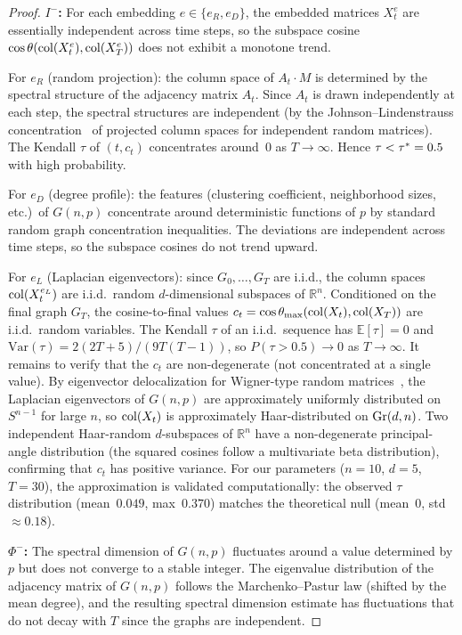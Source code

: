 \documentclass{../shared/primo}
\begin{document}
\begin{proof}
\textbf{$I^-$:} For each embedding $e \in \{e_R, e_D\}$, the embedded matrices $X_t^e$ are essentially independent across time steps, so the subspace cosine $\cos\theta(\operatorname{col}(X_t^e), \operatorname{col}(X_T^e))$ does not exhibit a monotone trend.

For $e_R$ (random projection): the column space of $A_t \cdot M$ is determined by the spectral structure of the adjacency matrix $A_t$. Since $A_t$ is drawn independently at each step, the spectral structures are independent (by the Johnson--Lindenstrauss concentration~\cite{johnson1984extensions} of projected column spaces for independent random matrices). The Kendall $\tau$ of $(t, c_t)$ concentrates around~0 as $T \to \infty$. Hence $\tau < \tau^* = 0.5$ with high probability.

For $e_D$ (degree profile): the features (clustering coefficient, neighborhood sizes, etc.)\ of $G(n, p)$ concentrate around deterministic functions of $p$ by standard random graph concentration inequalities. The deviations are independent across time steps, so the subspace cosines do not trend upward.

For $e_L$ (Laplacian eigenvectors): since $G_0, \ldots, G_T$ are i.i.d., the column spaces $\operatorname{col}(X_t^{e_L})$ are i.i.d.\ random $d$-dimensional subspaces of $\mathbb{R}^n$. Conditioned on the final graph $G_T$, the cosine-to-final values $c_t = \cos\theta_{\max}(\operatorname{col}(X_t), \operatorname{col}(X_T))$ are i.i.d.\ random variables. The Kendall $\tau$ of an i.i.d.\ sequence has $\mathbb{E}[\tau] = 0$ and $\mathrm{Var}(\tau) = 2(2T+5)/(9T(T-1))$, so $P(\tau > 0.5) \to 0$ as $T \to \infty$. It remains to verify that the $c_t$ are non-degenerate (not concentrated at a single value). By eigenvector delocalization for Wigner-type random matrices~\cite{erdos2012rigidity}, the Laplacian eigenvectors of $G(n, p)$ are approximately uniformly distributed on $S^{n-1}$ for large $n$, so $\operatorname{col}(X_t)$ is approximately Haar-distributed on $\operatorname{Gr}(d, n)$. Two independent Haar-random $d$-subspaces of $\mathbb{R}^n$ have a non-degenerate principal-angle distribution (the squared cosines follow a multivariate beta distribution), confirming that $c_t$ has positive variance. For our parameters ($n = 10$, $d = 5$, $T = 30$), the approximation is validated computationally: the observed $\tau$ distribution (mean~$0.049$, max~$0.370$) matches the theoretical null (mean~0, std~$\approx 0.18$).

\textbf{$\Phi^-$:} The spectral dimension of $G(n, p)$ fluctuates around a value determined by $p$ but does not converge to a stable integer. The eigenvalue distribution of the adjacency matrix of $G(n, p)$ follows the Marchenko--Pastur law (shifted by the mean degree), and the resulting spectral dimension estimate has fluctuations that do not decay with $T$ since the graphs are independent.


\end{proof}
\end{document}
